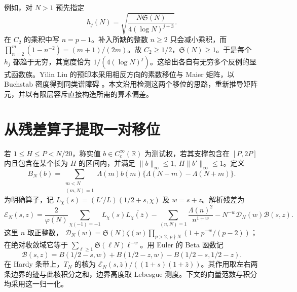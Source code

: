 \documentclass[UTF8,a4paper,11pt,fontset=windows]{ctexart}
\newcommand{\Sg}{\mathfrak S}
\newcommand{\RR}{\mathbb R}
\newcommand{\Lam}{\Lambda}
\begin{document}
例如，对 \(N>1\) 预先指定
\[
              h_j(N)=\sqrt{\frac{N\Sg(N)}{4(\log N)^{j+3}}}.
                                                               \tag{2}
\]
在 \(C_2\) 的乘积中写 \(n=p-1\)。补入所缺的整数 \(n\ge2\) 只会减小乘积，而
\(\prod_{n=2}^{m}(1-n^{-2})=(m+1)/(2m)\)。故 \(C_2\ge1/2\)，\(\Sg(N)\ge1\)。于是每个 \(h_j\) 都趋于无穷，其宽度恰为 \(1/(4(\log N)^j)\)。这给出各自有无穷多个反例的显式函数族。Yilin Liu 的预印本采用相反方向的素数移位与 Maier 矩阵，以 Buchstab 密度得到同类谱障碍 \cite{YL}。本文沿用检测这两个移位的思路，重新推导矩阵元，并以有限层容斥直接构造所需的算术偏差。

\section{从残差算子提取一对移位}
若 \(1\le H\le P<N/20\)，称实值 \(b\in C^\infty_c(\RR)\) 为测试权，若其支撑包含在 \([P,2P]\) 内且包含在某个长为 \(H\) 的区间内，并满足
\(\|b\|_\infty\le1,\ H\|b'\|_\infty\le1\)。定义
\[
 B_N(b)=\sum_{\substack{m<N\\(m,N)=1}}\Lam(m)b(m)
                      \{\Lam(N-m)-\Lam(N+m)\}.
\]
为明确算子，记 \(L_\chi(s)= (L'/L)(1/2+s,\chi)\) 及 \(w=s+z\)。解析残差为
\[
 \mathcal E_N(s,z)=\frac{2}{\varphi(N)}
 \sum_{\chi(-1)=-1} L_\chi(s)\overline{L_\chi(\bar z)}
 -\sum_{(n,N)=1}\frac{\Lam(n)^2}{n^{1+w}}
 -N^{-w}\mathcal D_N(w)\mathcal B(s,z).
\]
这里 \(n\) 取正整数，
\(\mathcal D_N(w)=\Sg(N)\zeta(w)\prod_{p>2,\,p\nmid N}(1+p^{-w}/(p-2))\)；
在绝对收敛域它等于 \(\sum_{\ell\ge1}\Sg(\ell N)\ell^{-w}\)。用 Euler 的 Beta 函数记
\[
 \mathcal B(s,z)=B(1/2-s,w)+B(1/2-z,w)-B(1/2-s,1/2-z).
\]
在 Hardy 条带上，\(T_N\) 的核为 \(\mathcal E_N(s,\bar z)/((1+s)(1+\bar z))\)。其作用取左右两条边界的迹与此核积分之和，边界高度取 Lebesgue 测度。下文的向量范数与积分均采用这一归一化。
\end{document}
